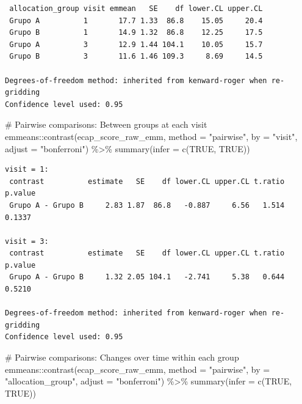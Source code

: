 \documentclass[
  letterpaper,
  DIV=11,
  numbers=noendperiod]{scrartcl}
\newenvironment{Shaded}{\begin{snugshade}}{\end{snugshade}}
\newcommand{\AttributeTok}[1]{\textcolor[rgb]{0.40,0.45,0.13}{#1}}
\newcommand{\CommentTok}[1]{\textcolor[rgb]{0.37,0.37,0.37}{#1}}
\newcommand{\ConstantTok}[1]{\textcolor[rgb]{0.56,0.35,0.01}{#1}}
\newcommand{\FunctionTok}[1]{\textcolor[rgb]{0.28,0.35,0.67}{#1}}
\newcommand{\NormalTok}[1]{\textcolor[rgb]{0.00,0.23,0.31}{#1}}
\newcommand{\SpecialCharTok}[1]{\textcolor[rgb]{0.37,0.37,0.37}{#1}}
\newcommand{\StringTok}[1]{\textcolor[rgb]{0.13,0.47,0.30}{#1}}
\begin{document}
\begin{verbatim}
 allocation_group visit emmean   SE    df lower.CL upper.CL
 Grupo A          1       17.7 1.33  86.8    15.05     20.4
 Grupo B          1       14.9 1.32  86.8    12.25     17.5
 Grupo A          3       12.9 1.44 104.1    10.05     15.7
 Grupo B          3       11.6 1.46 109.3     8.69     14.5

Degrees-of-freedom method: inherited from kenward-roger when re-gridding 
Confidence level used: 0.95 
\end{verbatim}

\begin{Shaded}
\begin{Highlighting}[]
\CommentTok{\# Pairwise comparisons: Between groups at each visit}
\NormalTok{emmeans}\SpecialCharTok{::}\FunctionTok{contrast}\NormalTok{(ecap\_score\_raw\_emm, }\AttributeTok{method =} \StringTok{"pairwise"}\NormalTok{, }\AttributeTok{by =} \StringTok{"visit"}\NormalTok{, }\AttributeTok{adjust =} \StringTok{"bonferroni"}\NormalTok{) }\SpecialCharTok{\%\textgreater{}\%} \FunctionTok{summary}\NormalTok{(}\AttributeTok{infer =} \FunctionTok{c}\NormalTok{(}\ConstantTok{TRUE}\NormalTok{, }\ConstantTok{TRUE}\NormalTok{))}
\end{Highlighting}
\end{Shaded}

\begin{verbatim}
visit = 1:
 contrast          estimate   SE    df lower.CL upper.CL t.ratio p.value
 Grupo A - Grupo B     2.83 1.87  86.8   -0.887     6.56   1.514  0.1337

visit = 3:
 contrast          estimate   SE    df lower.CL upper.CL t.ratio p.value
 Grupo A - Grupo B     1.32 2.05 104.1   -2.741     5.38   0.644  0.5210

Degrees-of-freedom method: inherited from kenward-roger when re-gridding 
Confidence level used: 0.95 
\end{verbatim}

\begin{Shaded}
\begin{Highlighting}[]
\CommentTok{\# Pairwise comparisons: Changes over time within each group}
\NormalTok{emmeans}\SpecialCharTok{::}\FunctionTok{contrast}\NormalTok{(ecap\_score\_raw\_emm, }\AttributeTok{method =} \StringTok{"pairwise"}\NormalTok{, }\AttributeTok{by =} \StringTok{"allocation\_group"}\NormalTok{, }\AttributeTok{adjust =} \StringTok{"bonferroni"}\NormalTok{) }\SpecialCharTok{\%\textgreater{}\%} \FunctionTok{summary}\NormalTok{(}\AttributeTok{infer =} \FunctionTok{c}\NormalTok{(}\ConstantTok{TRUE}\NormalTok{, }\ConstantTok{TRUE}\NormalTok{))}
\end{Highlighting}
\end{Shaded}
\end{document}
